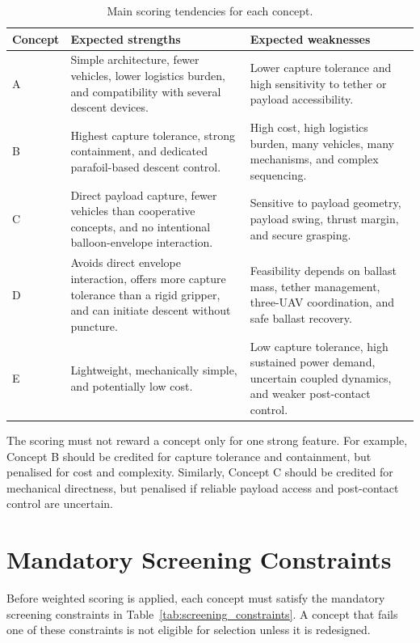 \begin{table}[H]
\centering
\small
\caption{Main scoring tendencies for each concept.}
\label{tab:concept_scoring_guidance}
\begin{tabularx}{\textwidth}{p{} X X}
\toprule
\textbf{Concept} & \textbf{Expected strengths} & \textbf{Expected weaknesses} \\
\midrule
A & Simple architecture, fewer vehicles, lower logistics burden, and compatibility with several descent devices. & Lower capture tolerance and high sensitivity to tether or payload accessibility. \\
B & Highest capture tolerance, strong containment, and dedicated parafoil-based descent control. & High cost, high logistics burden, many vehicles, many mechanisms, and complex sequencing. \\
C & Direct payload capture, fewer vehicles than cooperative concepts, and no intentional balloon-envelope interaction. & Sensitive to payload geometry, payload swing, thrust margin, and secure grasping. \\
D & Avoids direct envelope interaction, offers more capture tolerance than a rigid gripper, and can initiate descent without puncture. & Feasibility depends on ballast mass, tether management, three-UAV coordination, and safe ballast recovery. \\
E & Lightweight, mechanically simple, and potentially low cost. & Low capture tolerance, high sustained power demand, uncertain coupled dynamics, and weaker post-contact control. \\
\bottomrule
\end{tabularx}
\end{table}

The scoring must not reward a concept only for one strong feature. For example, Concept B should be credited for capture tolerance and containment, but penalised for cost and complexity. Similarly, Concept C should be credited for mechanical directness, but penalised if reliable payload access and post-contact control are uncertain.






\section{Mandatory Screening Constraints}

Before weighted scoring is applied, each concept must satisfy the mandatory screening constraints in Table~\ref{tab:screening_constraints}. A concept that fails one of these constraints is not eligible for selection unless it is redesigned.

